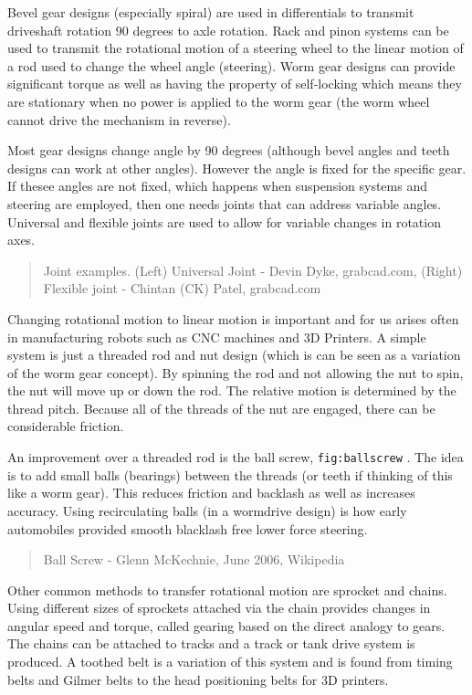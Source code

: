 Bevel gear designs (especially spiral) are used in differentials to
transmit driveshaft rotation 90 degrees to axle rotation. Rack and pinon
systems can be used to transmit the rotational motion of a steering
wheel to the linear motion of a rod used to change the wheel angle
(steering). Worm gear designs can provide significant torque as well as
having the property of self-locking which means they are stationary when
no power is applied to the worm gear (the worm wheel cannot drive the
mechanism in reverse).

Most gear designs change angle by 90 degrees (although bevel angles and
teeth designs can work at other angles). However the angle is fixed for
the specific gear. If thesee angles are not fixed, which happens when
suspension systems and steering are employed, then one needs joints that
can address variable angles. Universal and flexible joints are used to
allow for variable changes in rotation axes.

\begin{quote}
Joint examples. (Left) Universal Joint - Devin Dyke, grabcad.com,
(Right) Flexible joint - Chintan (CK) Patel, grabcad.com
\end{quote}

Changing rotational motion to linear motion is important and for us
arises often in manufacturing robots such as CNC machines and 3D
Printers. A simple system is just a threaded rod and nut design (which
is can be seen as a variation of the worm gear concept). By spinning the
rod and not allowing the nut to spin, the nut will move up or down the
rod. The relative motion is determined by the thread pitch. Because all
of the threads of the nut are engaged, there can be considerable
friction.

An improvement over a threaded rod is the ball screw,
\texttt{fig:ballscrew} . The idea is to add small balls (bearings)
between the threads (or teeth if thinking of this like a worm gear).
This reduces friction and backlash as well as increases accuracy. Using
recirculating balls (in a wormdrive design) is how early automobiles
provided smooth blacklash free lower force steering.

\begin{quote}
Ball Screw - Glenn McKechnie, June 2006, Wikipedia
\end{quote}

Other common methods to transfer rotational motion are sprocket and
chains. Using different sizes of sprockets attached via the chain
provides changes in angular speed and torque, called gearing based on
the direct analogy to gears. The chains can be attached to tracks and a
track or tank drive system is produced. A toothed belt is a variation of
this system and is found from timing belts and Gilmer belts to the head
positioning belts for 3D printers.
